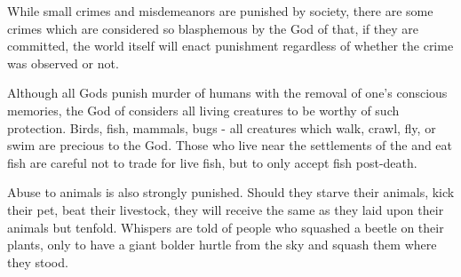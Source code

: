 \documentclass[blue]{GL2020}
\begin{document}
While small crimes and misdemeanors are punished by society, there are some crimes which are considered so blasphemous by the God of \pFarm{} that, if they are committed, the world itself will enact punishment regardless of whether the crime was observed or not.

Although all Gods punish murder of humans with the removal of one's conscious memories, the God of \pFarm{} considers all living creatures to be worthy of such protection.  Birds, fish, mammals, bugs - all creatures which walk, crawl, fly, or swim are precious to the God.  Those \pFarm{} who live near the settlements of the \pShip{} and eat fish are careful not to trade for live fish, but to only accept fish post-death.

Abuse to animals is also strongly punished.  Should they starve their animals, kick their pet, beat their livestock, they will receive the same as they laid upon their animals but tenfold.  Whispers are told of people who squashed a beetle on their plants, only to have a giant bolder hurtle from the sky and squash them where they stood.  %
\end{document}
